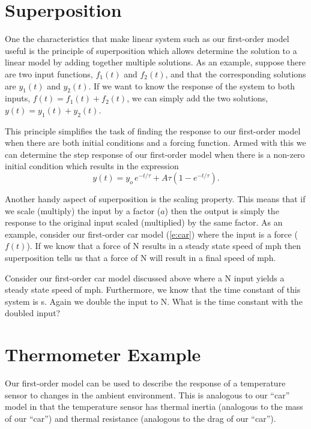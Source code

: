 \section{Superposition}
One the characteristics that make linear system such as our first-order model useful is the principle of \gls{superposition} which allows determine the solution to a linear model by adding together multiple solutions.  As an example, suppose there are two input functions, $f_1(t)$ and $f_2(t)$, and that the corresponding solutions are $y_1(t)$ and $y_2(t)$.  If we want to know the response of the system to both inputs, $f(t)=f_1(t)+f_2(t)$, we can simply add the two solutions, $y(t)=y_1(t)+y_2(t)$. 

This principle simplifies the task of finding the response to our first-order model when there are both initial conditions and a forcing function.  Armed with this we can determine the step response of our first-order model when there is a non-zero initial condition which results in the expression
\begin{equation}
y(t) = y_o \, e^{-t/\tau} + A\tau\left(1-e^{-t/\tau}\right).
\end{equation}

Another handy aspect of superposition is the scaling property.  This means that if we scale (multiply) the input by a factor ($a$) then the output is simply the response to the original input scaled (multiplied) by the same factor.  As an example, consider our first-order car model (\ref{e:car}) where the input is a force ($f(t)$).  If we know that a force of \unit[1,000]{N} results in a steady state speed of \unit[25]{mph} then superposition tells us that a force of \unit[2,000]{N} will result in a final speed of \unit[50]{mph}.

\begin{ex}
Consider our first-order car model discussed above where a \unit[1,000]{N} input yields a steady state speed of \unit[25]{mph}.  Furthermore, we know that the time constant of this system is \unit[2]{s}.  Again we double the input to \unit[2,000]{N}. What is the time constant with the doubled input?
\end{ex}

\section{Thermometer Example}
Our first-order model can be used to describe the response of a temperature sensor to changes in the ambient environment.  This is analogous to our ``car'' model in that the temperature sensor has thermal inertia (analogous to the mass of our ``car'') and thermal resistance (analogous to the drag of our ``car'').  

